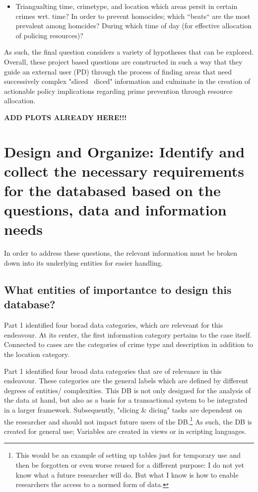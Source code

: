 \documentclass[a4paper]{article}
\begin{document}
\begin{itemize}
  \item Triangualting time, crimetype, and location which areas persit in certain crimes wrt. time?
In order to prevent homocides; which “beats“ are the most prevalent among homcides? During which time of day (for effective allocation of policing resources)? 
\end{itemize}

As such, the final question considers a variety of hypotheses that can be explored. Overall, these project based questions are constructed in such a way that they guide an external user (PD) through the process of finding areas that need successively complex "sliced \ diced" information and culminate in the creation of actionable policy implications regarding prime prevention through resource allocation.


\textbf{ADD PLOTS ALREADY HERE!!!}


\section{Design and Organize: Identify and collect the necessary requirements for the databased based on the questions, data and information needs}
In order to address these questions, the relevant information must be broken down into its underlying entities for easier handling. 

\subsection{What entities of importantce to design this database?}
Part 1 identified four borad data categories, which are releveant for this endeavour. At its center, the first information category pertains to the case itself. Connected to cases are the categories of crime type and description in addition to the location category. 
 
 
 
 


Part 1 identified four broad data categories that are of relevance in this endeavour. These categories are the general labels which are defined by different degrees of entities/ complexities. This DB is not only designed for the analysis of the data at hand, but also as a basis for a transactional system to be integrated in a larger framework. Subsequently, "slicing \& dicing" tasks are dependent on the researcher and should not impact future users of the DB.\footnote{This would be an example of setting up tables just for temporary use and then be forgotten or even worse reused for a different purpose: I do not yet know what a future researcher will do. But what I know is how to enable researchers the access to a normed form of data.} As such, the DB is created for general use; Variables are created in views or in scripting languages. 
\end{document}
